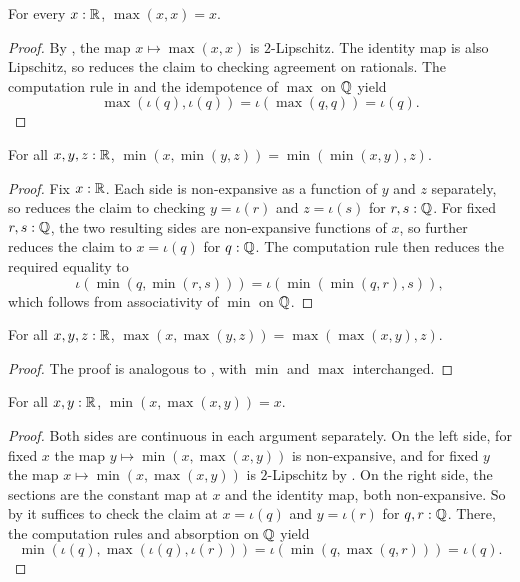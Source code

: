 \begin{lemma}
  \label{maxIdemReal}
  For every $x : \mathbb{R}$, $\max(x, x) = x$.
\end{lemma}
\begin{proof}
  By , the map $x \mapsto \max(x,x)$ is $2$-Lipschitz. The identity map is also Lipschitz, so  reduces the claim to checking agreement on rationals. The computation rule in  and the idempotence of $\max$ on $\mathbb{Q}$ yield
  \[
    \max(\iota(q),\iota(q)) = \iota(\max(q,q)) = \iota(q).
  \]
\end{proof}

\begin{lemma}
  \label{minAssocReal}
  For all $x, y, z : \mathbb{R}$, $\min(x, \min(y, z)) = \min(\min(x, y), z)$.
\end{lemma}
\begin{proof}
  Fix $x : \mathbb{R}$. Each side is non-expansive as a function of $y$ and $z$ separately, so  reduces the claim to checking $y = \iota(r)$ and $z = \iota(s)$ for $r, s : \mathbb{Q}$. For fixed $r,s : \mathbb{Q}$, the two resulting sides are non-expansive functions of $x$, so  further reduces the claim to $x = \iota(q)$ for $q : \mathbb{Q}$. The computation rule  then reduces the required equality to
  \[
    \iota(\min(q,\min(r,s))) = \iota(\min(\min(q,r),s)),
  \]
  which follows from associativity of $\min$ on $\mathbb{Q}$.
\end{proof}

\begin{lemma}
  \label{maxAssocReal}
  For all $x, y, z : \mathbb{R}$, $\max(x, \max(y, z)) = \max(\max(x, y), z)$.
\end{lemma}
\begin{proof}
  The proof is analogous to , with $\min$ and $\max$ interchanged.
\end{proof}

\begin{lemma}
  \label{minAbsorbLMaxReal}
  For all $x, y : \mathbb{R}$, $\min(x, \max(x, y)) = x$.
\end{lemma}
\begin{proof}
  Both sides are continuous in each argument separately. On the left side, for fixed $x$ the map $y \mapsto \min(x,\max(x,y))$ is non-expansive, and for fixed $y$ the map $x \mapsto \min(x,\max(x,y))$ is $2$-Lipschitz by . On the right side, the sections are the constant map at $x$ and the identity map, both non-expansive. So by  it suffices to check the claim at $x = \iota(q)$ and $y = \iota(r)$ for $q, r : \mathbb{Q}$. There, the computation rules  and absorption on $\mathbb{Q}$ yield
  \[
    \min(\iota(q),\max(\iota(q),\iota(r))) = \iota(\min(q,\max(q,r))) = \iota(q).
  \]
\end{proof}

